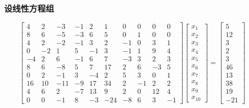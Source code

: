
\subsubsection{设线性方程组}



\[
    \begin{bmatrix}
        4  & 2  & -3  & -1 & 2  & 1   & 0  & 0  & 0  & 0  \\
        8  & 6  & -5  & -3 & 6  & 5   & 0  & 1  & 0  & 0  \\
        4  & 2  & -2  & -1 & 3  & 2   & -1 & 0  & 3  & 1  \\
        0  & -2 & 1   & 5  & -1 & 3   & -1 & 1  & 9  & 4  \\
        -4 & 2  & 6   & -1 & 6  & 7   & -3 & 3  & 2  & 3  \\
        8  & 6  & -8  & 5  & 7  & 17  & 2  & 6  & -3 & 5  \\
        0  & 2  & -1  & 3  & -4 & 2   & 5  & 3  & 0  & 1  \\
        16 & 10 & -11 & -9 & 17 & 34  & 2  & -1 & 2  & 2  \\
        4  & 6  & 2   & -7 & 13 & 9   & 2  & 0  & 12 & 4  \\
        0  & 0  & -1  & 8  & -3 & -24 & -8 & 6  & 3  & -1
    \end{bmatrix}
    \begin{bmatrix}
        x_1 \\
        x_2 \\
        x_3 \\
        x_4 \\
        x_5 \\
        x_6 \\
        x_7 \\
        x_8 \\
        x_9 \\
        x_{10}
    \end{bmatrix}
    =
    \begin{bmatrix}
        5  \\
        12 \\
        3  \\
        2  \\
        3  \\
        46 \\
        13 \\
        38 \\
        19 \\
        -21
    \end{bmatrix}
\]

